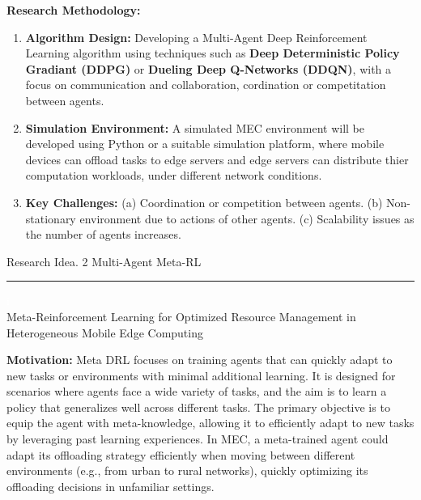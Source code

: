 \documentclass[12pt]{article}
\begin{document}
\noindent\textbf{\large Research Methodology: }
\begin{enumerate} 
	\item \textbf{Algorithm Design:} Developing a Multi-Agent Deep Reinforcement Learning algorithm using techniques such as \textbf{Deep Deterministic Policy Gradiant (DDPG)} or \textbf{Dueling Deep Q-Networks (DDQN)}, with a focus on communication and collaboration, cordination or competitation between agents. \vspace{-1mm}
	\item \textbf{Simulation Environment:} A simulated MEC environment will be developed using Python or a suitable simulation platform, where mobile devices can offload tasks to edge servers and edge servers can distribute thier computation workloads, under different network conditions.\vspace{-1mm}
	\item \textbf{Key Challenges:} (a) Coordination or competition between agents. (b) Non-stationary environment due to actions of other agents.  (c) Scalability issues as the number of agents increases.
\end{enumerate}



\newpage




\begin{center} 
	
	
	\vspace{-17mm}
	
	\large Research Idea. 2  \hfill Multi-Agent Meta-RL \vspace{1mm} \hrule
	
	\vspace{-1mm}
	
	
	
	\textcolor{white}{i} \\ \LARGE Meta-Reinforcement Learning for Optimized Resource Management in Heterogeneous Mobile Edge Computing  \vspace{6mm}\\
	
\end{center}
\vspace{-5mm}

\noindent\textbf{\large Motivation:  }
\noindent
Meta DRL focuses on training agents that can quickly adapt to new tasks or environments with minimal additional learning. It is designed for scenarios where agents face a wide variety of tasks, and the aim is to learn a policy that generalizes well across different tasks. The primary objective is to equip the agent with meta-knowledge, allowing it to efficiently adapt to new tasks by leveraging past learning experiences. In MEC, a meta-trained agent could adapt its offloading strategy efficiently when moving between different environments (e.g., from urban to rural networks), quickly optimizing its offloading decisions in unfamiliar settings.
\end{document}
